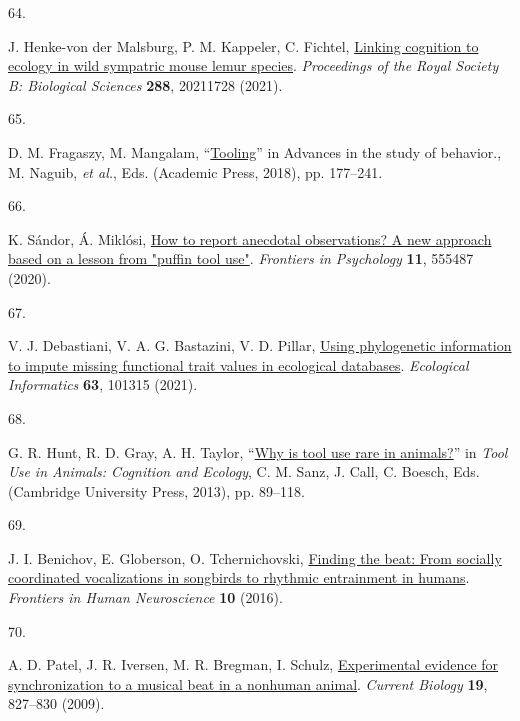 \documentclass[
  man,floatsintext]{apa6}
\newlength{\cslhangindent}
\newlength{\csllabelwidth}
\newlength{\cslentryspacingunit} %
\newenvironment{CSLReferences}[2] %
 {%
  \setlength{\parindent}{0pt}
  \ifodd #1
  \let\oldpar\par
  \def\par{\hangindent=\cslhangindent\oldpar}
  \fi
  \setlength{\parskip}{#2\cslentryspacingunit}
 }%
 {}
\newcommand{\CSLLeftMargin}[1]{\parbox[t]{\csllabelwidth}{#1}}
\newcommand{\CSLRightInline}[1]{\parbox[t]{\linewidth - \csllabelwidth}{#1}\break}
\begin{document}
\begin{CSLReferences}{0}{0}
\leavevmode{}%
\CSLLeftMargin{64. }%
\CSLRightInline{J. Henke-von der Malsburg, P. M. Kappeler, C. Fichtel, \href{https://doi.org/10.1098/rspb.2021.1728}{Linking cognition to ecology in wild sympatric mouse lemur species}. \emph{Proceedings of the Royal Society B: Biological Sciences} \textbf{288}, 20211728 (2021).}

\leavevmode{}%
\CSLLeftMargin{65. }%
\CSLRightInline{D. M. Fragaszy, M. Mangalam, {``\href{https://doi.org/10.1016/bs.asb.2018.01.001}{Tooling}''} in Advances in the study of behavior., M. Naguib, \emph{et al.}, Eds. (Academic Press, 2018), pp. 177--241.}

\leavevmode{}%
\CSLLeftMargin{66. }%
\CSLRightInline{K. Sándor, Á. Miklósi, \href{https://doi.org/10.3389/fpsyg.2020.555487}{How to report anecdotal observations? A new approach based on a lesson from "puffin tool use"}. \emph{Frontiers in Psychology} \textbf{11}, 555487 (2020).}

\leavevmode{}%
\CSLLeftMargin{67. }%
\CSLRightInline{V. J. Debastiani, V. A. G. Bastazini, V. D. Pillar, \href{https://doi.org/10.1016/j.ecoinf.2021.101315}{Using phylogenetic information to impute missing functional trait values in ecological databases}. \emph{Ecological Informatics} \textbf{63}, 101315 (2021).}

\leavevmode{}%
\CSLLeftMargin{68. }%
\CSLRightInline{G. R. Hunt, R. D. Gray, A. H. Taylor, {``\href{https://doi.org/10.1017/CBO9780511894800.007}{Why is tool use rare in animals?}''} in \emph{Tool Use in Animals: Cognition and Ecology}, C. M. Sanz, J. Call, C. Boesch, Eds. (Cambridge University Press, 2013), pp. 89--118.}

\leavevmode{}%
\CSLLeftMargin{69. }%
\CSLRightInline{J. I. Benichov, E. Globerson, O. Tchernichovski, \href{https://doi.org/10.3389/fnhum.2016.00255}{Finding the beat: From socially coordinated vocalizations in songbirds to rhythmic entrainment in humans}. \emph{Frontiers in Human Neuroscience} \textbf{10} (2016).}

\leavevmode{}%
\CSLLeftMargin{70. }%
\CSLRightInline{A. D. Patel, J. R. Iversen, M. R. Bregman, I. Schulz, \href{https://doi.org/10.1016/j.cub.2009.03.038}{Experimental evidence for synchronization to a musical beat in a nonhuman animal}. \emph{Current Biology} \textbf{19}, 827--830 (2009).}


\end{CSLReferences}
\end{document}
